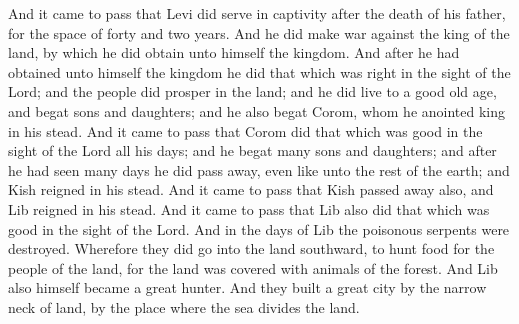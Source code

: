 And it came to pass that Levi did serve in captivity after the death of his father, for the space of forty and two years.  And he did make war against the king of the land, by which he did obtain unto himself the kingdom.
\bverse \iffalse And after he had obtained unto himself the kingdom he did that which was right in the sight of the Lord; and the people did prosper in the land; and he did live to a good old age, and begat sons and daughters; and he also begat Corom, whom he anointed king in his stead. \fi
And after he had obtained unto himself the kingdom he did that which was right in the sight of the Lord; and the people did prosper in the land; and he did live to a good old age, and begat sons and daughters; and he also begat Corom, whom he anointed king in his stead.
\bverse \iffalse And it came to pass that Corom did that which was good in the sight of the Lord all his days; and he begat many sons and daughters; and after he had seen many days he did pass away, even like unto the rest of the earth; and Kish reigned in his stead. \fi
And it came to pass that Corom did that which was good in the sight of the Lord all his days; and he begat many sons and daughters; and after he had seen many days he did pass away, even like unto the rest of the earth; and Kish reigned in his stead.
\bverse \iffalse And it came to pass that Kish passed away also, and Lib reigned in his stead. \fi
And it came to pass that Kish passed away also, and Lib reigned in his stead.
\bverse \iffalse And it came to pass that Lib also did that which was good in the sight of the Lord. And in the days of Lib the poisonous serpents were destroyed. Wherefore they did go into the land southward, to hunt food for the people of the land, for the land was covered with animals of the forest. And Lib also himself became a great hunter. \fi
And it came to pass that Lib also did that which was good in the sight of the Lord. And in the days of Lib the poisonous serpents were destroyed. Wherefore they did go into the land southward, to hunt food for the people of the land, for the land was covered with animals of the forest. And Lib also himself became a great hunter.
\bverse \iffalse And they built a great city by the narrow neck of land, by the place where the sea divides the land. \fi
And they built a great city by the narrow neck of land, by the place where the sea divides the land.
\bverse \iffalse And they did preserve the land southward for a wilderness, to get game. And the whole face of the land northward was covered with inhabitants. \fi

